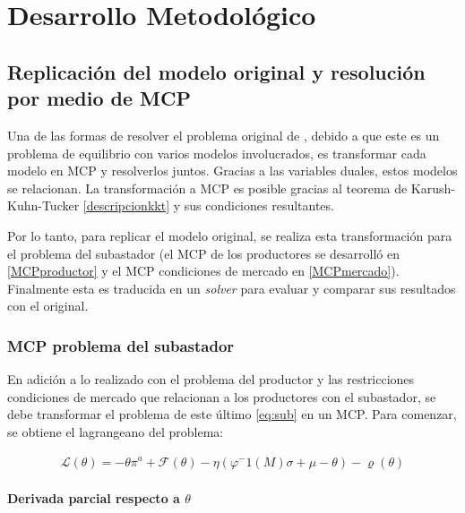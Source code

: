 
\chapter{Desarrollo Metodológico} \label{MCP:subastador} %


\section{Replicación del modelo original y resolución por medio de MCP}

Una de las formas de resolver el problema original de , debido a que este es un problema de equilibrio con varios modelos involucrados, es transformar cada modelo en MCP y resolverlos juntos. Gracias a las variables duales, estos modelos se relacionan. La transformación a MCP es posible gracias al teorema de Karush-Kuhn-Tucker \ref{descripcionkkt} y sus condiciones resultantes. 
\vspace{2.5mm}

Por lo tanto, para replicar el modelo original, se realiza esta transformación para el problema del subastador (el MCP de los productores se desarrolló en \ref{MCPproductor} y el MCP condiciones de mercado en \ref{MCPmercado}). Finalmente esta es traducida en un \textit{solver} para evaluar y comparar sus resultados con el original.

\subsection{MCP problema del subastador} \label{MCPsubastador}

En adición a lo realizado con el problema del productor y las restricciones condiciones de mercado que relacionan a los productores con el subastador, se debe transformar el problema de este último \ref{eq:sub} en un MCP.  Para comenzar, se obtiene el lagrangeano del problema:

\begin{footnotesize}
\begin{align}
\mathcal{L}(\theta) = -\theta\pi^a + \mathcal{F}(\theta) - \eta (\varphi^-1(M)\sigma+\mu-\theta) - \varrho(\theta)  \label{eq:lagrange2}
\end{align}
\end{footnotesize}


\subsubsection{Derivada parcial respecto a $\theta$}

